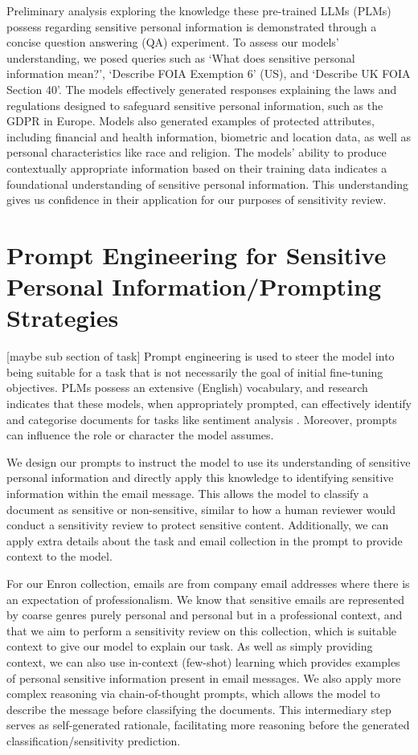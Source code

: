 Preliminary analysis exploring the knowledge these pre-trained LLMs (PLMs) possess regarding sensitive personal information is demonstrated through a concise question answering (QA) experiment. To assess our models’ understanding, we posed queries such as ‘What does sensitive personal information mean?’, ‘Describe FOIA Exemption 6’ (US), and ‘Describe UK FOIA Section 40’. The models effectively generated responses explaining the laws and regulations designed to safeguard sensitive personal information, such as the GDPR in Europe. Models also generated examples of protected attributes, including financial and health information, biometric and location data, as well as personal characteristics like race and religion. The models' ability to produce contextually appropriate information based on their training data indicates a foundational understanding of sensitive personal information. This understanding gives us confidence in their application for our purposes of sensitivity review.

\section{Prompt Engineering for Sensitive Personal Information/Prompting Strategies}
[maybe sub section of task]
Prompt engineering is used to steer the model into being suitable for a task that is not necessarily the goal of initial fine-tuning objectives. PLMs possess an extensive (English) vocabulary, and research indicates that these models, when appropriately prompted, can effectively identify and categorise documents for tasks like sentiment analysis \cite{kocon2023chatgpt, krugmann2024sentiment}. Moreover, prompts can influence the role or character the model assumes.

We design our prompts to instruct the model to use its understanding of sensitive personal information and directly apply this knowledge to identifying sensitive information within the email message. This allows the model to classify a document as sensitive or non-sensitive, similar to how a human reviewer would conduct a sensitivity review to protect sensitive content. Additionally, we can apply extra details about the task and email collection in the prompt to provide context to the model.

For our Enron collection, emails are from company email addresses where there is an expectation of professionalism. We know that sensitive emails are represented by coarse genres purely personal and personal but in a professional context, and that we aim to perform a sensitivity review on this collection, which is suitable context to give our model to explain our task. As well as simply providing context, we can also use in-context (few-shot) learning which provides examples of personal sensitive information present in email messages. We also apply more complex reasoning via chain-of-thought prompts, which allows the model to describe the message before classifying the documents. This intermediary step serves as self-generated rationale, facilitating more reasoning before the generated classification/sensitivity prediction.
